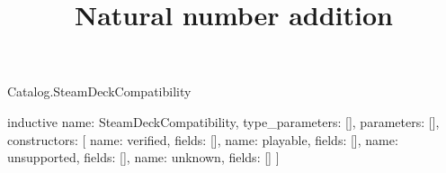 \begin{lexlean}{Catalog.SteamDeckCompatibility}
\title{Natural number addition}
\begin{semanticmodule}
inductive{
  name: SteamDeckCompatibility,
  type_parameters: [],
  parameters: [],
  constructors: [
    {name: verified, fields: []},
    {name: playable, fields: []},
    {name: unsupported, fields: []},
    {name: unknown, fields: []}
  ]
}
\end{semanticmodule}
\end{lexlean}
